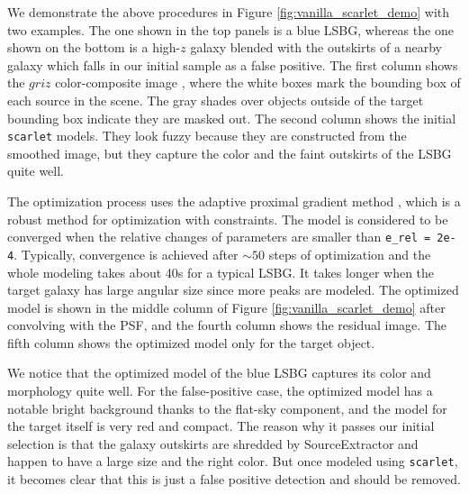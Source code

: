 \documentclass[twocolumn,astrosymb,twocolappendix]{aastex631}
\newcommand{\code}[1]{\texttt{#1}}
\begin{document}
\begin{CJK*}{UTF8}{gbsn}
We demonstrate the above procedures in Figure \ref{fig:vanilla_scarlet_demo} with two examples. The one shown in the top panels is a blue LSBG, whereas the one shown on the bottom is a high-$z$ galaxy blended with the outskirts of a nearby galaxy which falls in our initial sample as a false positive. The first column shows the $griz$ color-composite image \citep{Lupton2004}, where the white boxes mark the bounding box of each source in the scene. The gray shades over objects outside of the target bounding box indicate they are masked out. The second column shows the initial \code{scarlet} models. They look fuzzy because they are constructed from the smoothed image, but they capture the color and the faint outskirts of the LSBG quite well. 

The optimization process uses the adaptive proximal gradient method \citep{Melchior2019}, which is a robust method for optimization with constraints. The model is considered to be converged when the relative changes of parameters are smaller than \code{e\_rel\,=\,2e-4}. Typically, convergence is achieved after $\sim 50$ steps of optimization and the whole modeling takes about 40s for a typical LSBG. It takes longer when the target galaxy has large angular size since more peaks are modeled. The optimized model is shown in the middle column of Figure \ref{fig:vanilla_scarlet_demo} after convolving with the PSF, and the fourth column shows the residual image. The fifth column shows the optimized model only for the target object. 

We notice that the optimized model of the blue LSBG captures its color and morphology quite well. For the false-positive case, the optimized model has a notable bright background thanks to the flat-sky component, and the model for the target itself is very red and compact. The reason why it passes our initial selection is that the galaxy outskirts are shredded by SourceExtractor and happen to have a large size and the right color. But once modeled using \code{scarlet}, it becomes clear that this is just a false positive detection and should be removed. 





\end{CJK*}
\end{document}
